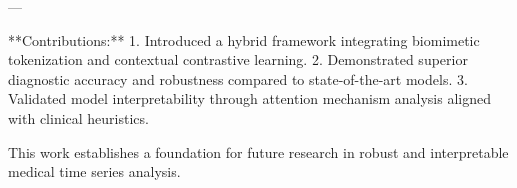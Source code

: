 ---

**Contributions:**  
1. Introduced a hybrid framework integrating biomimetic tokenization and contextual contrastive learning.  
2. Demonstrated superior diagnostic accuracy and robustness compared to state-of-the-art models.  
3. Validated model interpretability through attention mechanism analysis aligned with clinical heuristics.  

This work establishes a foundation for future research in robust and interpretable medical time series analysis.  